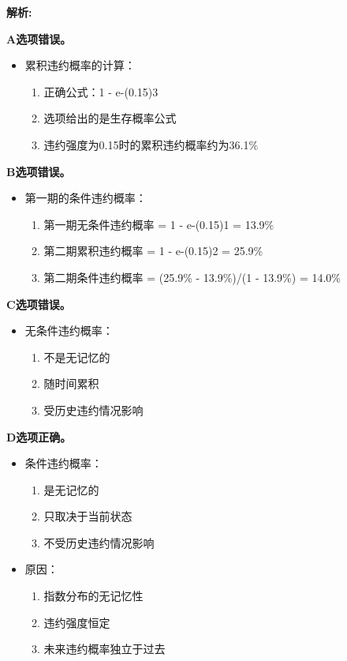 \documentclass{article}
\newenvironment{explanation}
{\textbf{解析:}\par}
{\par}
\begin{document}
\begin{explanation}
    \textbf{A选项错误。}
    \begin{itemize}
        \item 累积违约概率的计算：
        \begin{enumerate}
            \item 正确公式：1 - e-(0.15)3
            \item 选项给出的是生存概率公式
            \item 违约强度为0.15时的累积违约概率约为36.1\%
        \end{enumerate}
    \end{itemize}
    
    \textbf{B选项错误。}
    \begin{itemize}
        \item 第一期的条件违约概率：
        \begin{enumerate}
            \item 第一期无条件违约概率 = 1 - e-(0.15)1 = 13.9\%
            \item 第二期累积违约概率 = 1 - e-(0.15)2 = 25.9\%
            \item 第二期条件违约概率 = (25.9\% - 13.9\%)/(1 - 13.9\%) = 14.0\%
        \end{enumerate}
    \end{itemize}
    
    \textbf{C选项错误。}
    \begin{itemize}
        \item 无条件违约概率：
        \begin{enumerate}
            \item 不是无记忆的
            \item 随时间累积
            \item 受历史违约情况影响
        \end{enumerate}
    \end{itemize}
    
    \textbf{D选项正确。}
    \begin{itemize}
        \item 条件违约概率：
        \begin{enumerate}
            \item 是无记忆的
            \item 只取决于当前状态
            \item 不受历史违约情况影响
        \end{enumerate}
        \item 原因：
        \begin{enumerate}
            \item 指数分布的无记忆性
            \item 违约强度恒定
            \item 未来违约概率独立于过去
        \end{enumerate}
    \end{itemize}
\end{explanation}
\end{document}
